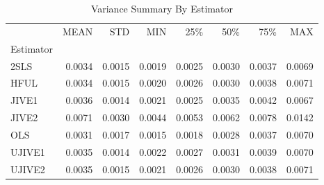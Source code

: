 \begin{table}[ht]
\centering
\caption{Variance Summary By Estimator}
\begin{tabular}{lrrrrrrr}
\toprule
 & MEAN & STD & MIN & 25\% & 50\% & 75\% & MAX \\
Estimator &  &  &  &  &  &  &  \\
\midrule
2SLS & 0.0034 & 0.0015 & 0.0019 & 0.0025 & 0.0030 & 0.0037 & 0.0069 \\
HFUL & 0.0034 & 0.0015 & 0.0020 & 0.0026 & 0.0030 & 0.0038 & 0.0071 \\
JIVE1 & 0.0036 & 0.0014 & 0.0021 & 0.0025 & 0.0035 & 0.0042 & 0.0067 \\
JIVE2 & 0.0071 & 0.0030 & 0.0044 & 0.0053 & 0.0062 & 0.0078 & 0.0142 \\
OLS & 0.0031 & 0.0017 & 0.0015 & 0.0018 & 0.0028 & 0.0037 & 0.0070 \\
UJIVE1 & 0.0035 & 0.0014 & 0.0022 & 0.0027 & 0.0031 & 0.0039 & 0.0070 \\
UJIVE2 & 0.0035 & 0.0015 & 0.0021 & 0.0026 & 0.0030 & 0.0038 & 0.0071 \\
\bottomrule
\end{tabular}
\end{table}
